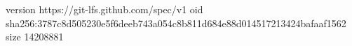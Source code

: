 version https://git-lfs.github.com/spec/v1
oid sha256:3787c8d505230e5f6deeb743a054c8b811d684e88d014517213424bafaaf1562
size 14208881
